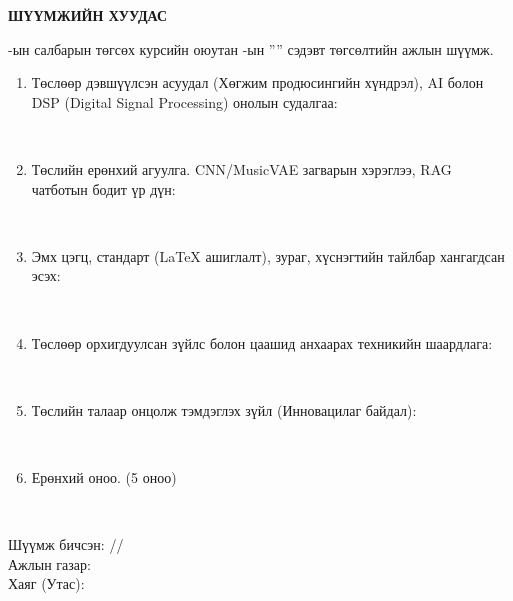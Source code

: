 \begin{titlepage}
\begin{center}

{\scshape\Large \univname\par} 
{\scshape\large \facname\par}\vspace{1cm} 

\textbf{{\Large ШҮҮМЖИЙН ХУУДАС}}\\[1cm]

\end{center}

\normalsize

\deptname-ын салбарын төгсөх курсийн оюутан \shortname-ын ''\ttitle'' сэдэвт төгсөлтийн ажлын шүүмж.

\begin{enumerate}
\item Төслөөр дэвшүүлсэн асуудал (Хөгжим продюсингийн хүндрэл), AI болон DSP (Digital Signal Processing) онолын судалгаа:
\begin{center}
\dotfill \\[0.4cm]
\end{center}
\item Төслийн ерөнхий агуулга. CNN/MusicVAE загварын хэрэглээ, RAG чатботын бодит үр дүн:
\begin{center}
\dotfill \\[0.4cm]
\end{center}
\item Эмх цэгц, стандарт (LaTeX ашиглалт), зураг, хүснэгтийн тайлбар хангагдсан эсэх:
\begin{center}
\dotfill \\[0.4cm]
\end{center}
\item Төслөөр орхигдуулсан зүйлс болон цаашид анхаарах техникийн шаардлага:
\begin{center}
\dotfill \\[0.4cm]
\end{center}
\item Төслийн талаар онцолж тэмдэглэх зүйл (Инновацилаг байдал):
\begin{center}
\dotfill \\[0.4cm]
\end{center}
\item Ерөнхий оноо. (5 оноо)
\begin{center}
\dotfill \\[0.8cm]
\end{center}
\end{enumerate}

Шүүмж бичсэн: \makebox[3cm]{\dotfill} /\readname/ \\[0.5cm]
Ажлын газар: \dotfill \\[0.5cm]
Хаяг (Утас): \makebox[5cm]{\dotfill}
\end{titlepage}
